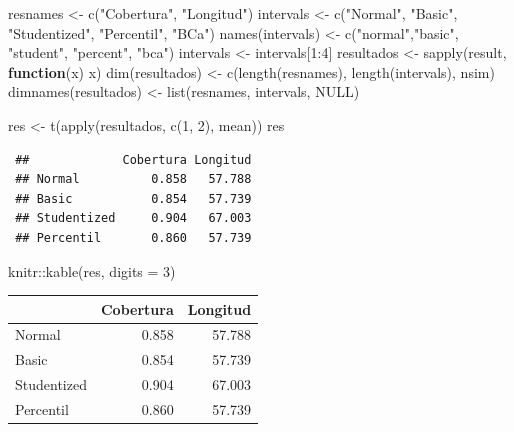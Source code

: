 \documentclass[
  10pt,
]{book}
\newenvironment{Shaded}{\begin{snugshade}}{\end{snugshade}}
\newcommand{\AttributeTok}[1]{\textcolor[rgb]{0.77,0.63,0.00}{#1}}
\newcommand{\ConstantTok}[1]{\textcolor[rgb]{0.00,0.00,0.00}{#1}}
\newcommand{\ControlFlowTok}[1]{\textcolor[rgb]{0.13,0.29,0.53}{\textbf{#1}}}
\newcommand{\DecValTok}[1]{\textcolor[rgb]{0.00,0.00,0.81}{#1}}
\newcommand{\FunctionTok}[1]{\textcolor[rgb]{0.00,0.00,0.00}{#1}}
\newcommand{\NormalTok}[1]{#1}
\newcommand{\OtherTok}[1]{\textcolor[rgb]{0.56,0.35,0.01}{#1}}
\newcommand{\SpecialCharTok}[1]{\textcolor[rgb]{0.00,0.00,0.00}{#1}}
\newcommand{\StringTok}[1]{\textcolor[rgb]{0.31,0.60,0.02}{#1}}
\theoremstyle{break}
\theoremstyle{nonumberplain}
\begin{document}
\begin{Shaded}
\begin{Highlighting}[]
\NormalTok{resnames }\OtherTok{\textless{}{-}} \FunctionTok{c}\NormalTok{(}\StringTok{"Cobertura"}\NormalTok{, }\StringTok{"Longitud"}\NormalTok{)}
\NormalTok{intervals }\OtherTok{\textless{}{-}} \FunctionTok{c}\NormalTok{(}\StringTok{"Normal"}\NormalTok{, }\StringTok{"Basic"}\NormalTok{, }\StringTok{"Studentized"}\NormalTok{, }\StringTok{"Percentil"}\NormalTok{, }\StringTok{"BCa"}\NormalTok{)}
\FunctionTok{names}\NormalTok{(intervals) }\OtherTok{\textless{}{-}} \FunctionTok{c}\NormalTok{(}\StringTok{"normal"}\NormalTok{,}\StringTok{"basic"}\NormalTok{, }\StringTok{"student"}\NormalTok{, }\StringTok{"percent"}\NormalTok{, }\StringTok{"bca"}\NormalTok{)}
\NormalTok{intervals }\OtherTok{\textless{}{-}}\NormalTok{ intervals[}\DecValTok{1}\SpecialCharTok{:}\DecValTok{4}\NormalTok{]}
\NormalTok{resultados }\OtherTok{\textless{}{-}} \FunctionTok{sapply}\NormalTok{(result, }\ControlFlowTok{function}\NormalTok{(x) x)}
\FunctionTok{dim}\NormalTok{(resultados) }\OtherTok{\textless{}{-}} \FunctionTok{c}\NormalTok{(}\FunctionTok{length}\NormalTok{(resnames), }\FunctionTok{length}\NormalTok{(intervals), nsim)}
\FunctionTok{dimnames}\NormalTok{(resultados) }\OtherTok{\textless{}{-}} \FunctionTok{list}\NormalTok{(resnames, intervals, }\ConstantTok{NULL}\NormalTok{)}

\NormalTok{res }\OtherTok{\textless{}{-}} \FunctionTok{t}\NormalTok{(}\FunctionTok{apply}\NormalTok{(resultados, }\FunctionTok{c}\NormalTok{(}\DecValTok{1}\NormalTok{, }\DecValTok{2}\NormalTok{), mean))}
\NormalTok{res}
\end{Highlighting}
\end{Shaded}

\begin{verbatim}
 ##             Cobertura Longitud
 ## Normal          0.858   57.788
 ## Basic           0.854   57.739
 ## Studentized     0.904   67.003
 ## Percentil       0.860   57.739
\end{verbatim}

\begin{Shaded}
\begin{Highlighting}[]
\NormalTok{knitr}\SpecialCharTok{::}\FunctionTok{kable}\NormalTok{(res, }\AttributeTok{digits =} \DecValTok{3}\NormalTok{)}
\end{Highlighting}
\end{Shaded}

\begin{tabular}{l|r|r}
\hline
  & Cobertura & Longitud\\
\hline
Normal & 0.858 & 57.788\\
\hline
Basic & 0.854 & 57.739\\
\hline
Studentized & 0.904 & 67.003\\
\hline
Percentil & 0.860 & 57.739\\
\hline
\end{tabular}
\end{document}
